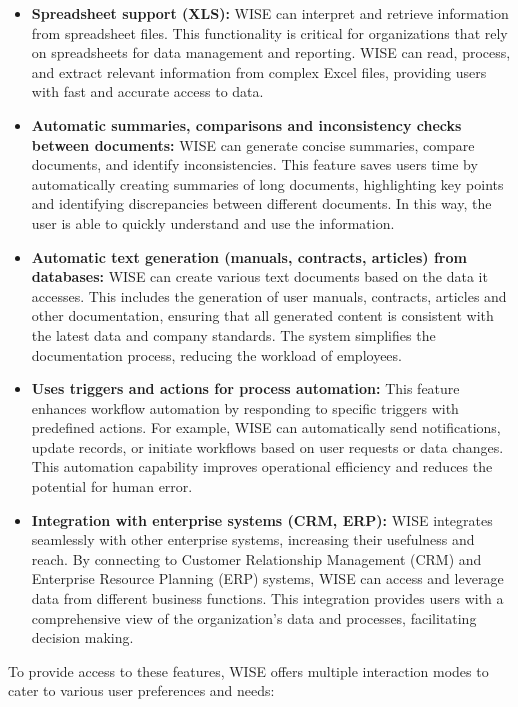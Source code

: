 \begin{itemize}
    \item \textbf{Spreadsheet support (XLS):} WISE can interpret and retrieve information from spreadsheet files. This functionality is critical for organizations that rely on spreadsheets for data management and reporting. WISE can read, process, and extract relevant information from complex Excel files, providing users with fast and accurate access to data.
    
    \item \textbf{Automatic summaries, comparisons and inconsistency checks between documents:} WISE can generate concise summaries, compare documents, and identify inconsistencies. This feature saves users time by automatically creating summaries of long documents, highlighting key points and identifying discrepancies between different documents. In this way, the user is able to quickly understand and use the information.
    
    \item \textbf{Automatic text generation (manuals, contracts, articles) from databases:} WISE can create various text documents based on the data it accesses. This includes the generation of user manuals, contracts, articles and other documentation, ensuring that all generated content is consistent with the latest data and company standards. The system simplifies the documentation process, reducing the workload of employees.
    
    \item \textbf{Uses triggers and actions for process automation:} This feature enhances workflow automation by responding to specific triggers with predefined actions. For example, WISE can automatically send notifications, update records, or initiate workflows based on user requests or data changes. This automation capability improves operational efficiency and reduces the potential for human error.
    
    \item \textbf{Integration with enterprise systems (CRM, ERP):} WISE integrates seamlessly with other enterprise systems, increasing their usefulness and reach. By connecting to Customer Relationship Management (CRM) and Enterprise Resource Planning (ERP) systems, WISE can access and leverage data from different business functions. This integration provides users with a comprehensive view of the organization's data and processes, facilitating decision making. \cite{hpa2024}
\end{itemize}

To provide access to these features, WISE offers multiple interaction modes to cater to various user preferences and needs:

